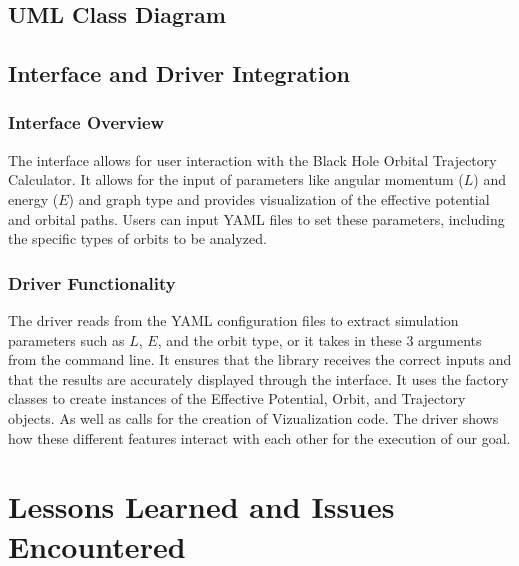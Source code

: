 \documentclass{article}
\begin{document}
\subsection{UML Class Diagram}





\subsection{Interface and Driver Integration}

\subsubsection{Interface Overview}
The interface allows for user interaction with the Black Hole Orbital Trajectory Calculator. It allows for the input of parameters like angular momentum (\(L\)) and energy (\(E\)) and graph type and provides visualization of the effective potential and orbital paths. Users can input YAML files to set these parameters, including the specific types of orbits to be analyzed.

\subsubsection{Driver Functionality}
The driver reads from the YAML configuration files to extract simulation parameters such as \(L\), \(E\), and the orbit type, or it takes in these 3 arguments from the command line.
It ensures that the library receives the correct inputs and that the results are accurately displayed through the interface. It uses the factory classes to create instances of the Effective Potential, Orbit, and Trajectory objects. As well as calls for the creation of Vizualization code. The driver shows how these different features interact with each other for the execution of our goal.

\section{Lessons Learned and Issues Encountered}
\end{document}

